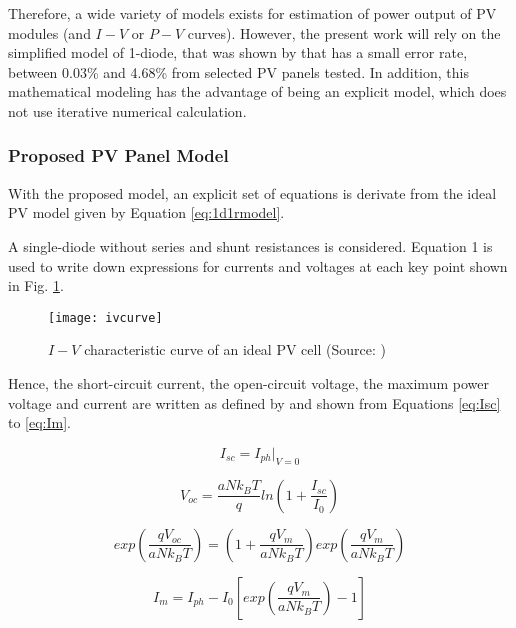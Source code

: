 Therefore, a wide variety of models exists for estimation of power output of PV modules (and $I-V$ or $P-V$ curves). However, the present work will rely on the simplified model of 1-diode, that was shown by \cite{Saloux} that has a small error rate, between 0.03\% and 4.68\% from selected PV panels tested. In addition, this mathematical modeling has the advantage of being an explicit model, which does not use iterative numerical calculation. 


\subsubsection{Proposed PV Panel Model}
With the proposed model, an explicit set of equations is derivate from the ideal PV model given by Equation \ref{eq:1d1rmodel}.

A single-diode without series and shunt resistances is considered. Equation 1 is used to write down expressions for currents and voltages at each key point shown in Fig. \ref{fig:ivcurve}.

\begin{figure}[h]
\texttt{[image: ivcurve]}
\centering
\caption{$ I-V $ characteristic curve of an ideal PV cell (Source: \cite{Saloux})}
\label{fig:ivcurve}
\end{figure}

Hence, the short-circuit current, the open-circuit voltage, the maximum power voltage and current are written as defined by \cite{Saloux} and shown from Equations \ref{eq:Isc} to \ref{eq:Im}.

\begin{equation}
\label{eq:Isc}
I_{sc}=I_{ph}\vert_{V=0}
\end{equation}

\begin{equation}
\label{eq:Voc}
V_{oc}=\dfrac{aNk_{B}T}{q}ln\left( 1+\dfrac{I_{sc}}{I_{0}} \right) 
\end{equation}

\begin{equation}
\label{eq:exp}
exp\left( \dfrac{qV_{oc}}{aNk_{B}T} \right) = \left(1+\dfrac{qV_{m}}{aNk_{B}T} \right) exp \left( \dfrac{qV_{m}}{aNk_{B}T} \right) 
\end{equation}

\begin{equation}
\label{eq:Im}
I_{m} =I_{ph}-I_{0}\left[ exp \left( \dfrac{qV_{m}}{aNk_{B}T} \right) -1 \right] 
\end{equation}

